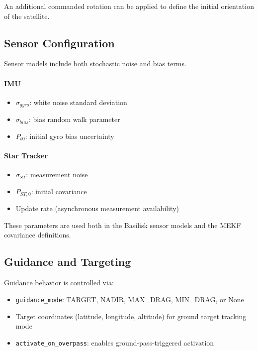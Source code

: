 An additional commanded rotation can be applied to define the initial orientation of the satellite.

\subsection{Sensor Configuration}

Sensor models include both stochastic noise and bias terms.

\paragraph{IMU}
\begin{itemize}
	\item $\sigma_{gyro}$: white noise standard deviation
	\item $\sigma_{bias}$: bias random walk parameter
	\item $P_{b0}$: initial gyro bias uncertainty
\end{itemize}

\paragraph{Star Tracker}
\begin{itemize}
	\item $\sigma_{ST}$: measurement noise
	\item $P_{ST,0}$: initial covariance
	\item Update rate (asynchronous measurement availability)
\end{itemize}

These parameters are used both in the Basilisk sensor models and the MEKF covariance definitions.

\subsection{Guidance and Targeting}

Guidance behavior is controlled via:

\begin{itemize}
	\item \texttt{guidance\_mode}: TARGET, NADIR, MAX\_DRAG, MIN\_DRAG, or None
	\item Target coordinates (latitude, longitude, altitude) for ground target tracking mode
	\item \texttt{activate\_on\_overpass}: enables ground-pass-triggered activation
\end{itemize}

